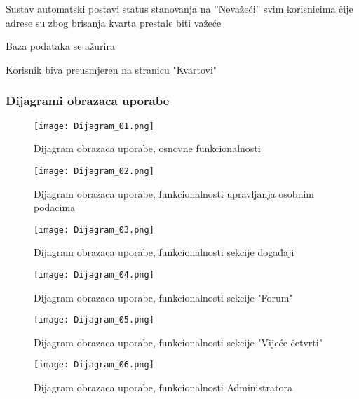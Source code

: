\begin{packed_item}
\begin{packed_item}
\begin{packed_enum}
								\item Sustav automatski postavi status stanovanja na ”Nevažeći” svim korisnicima čije adrese su zbog brisanja kvarta prestale biti važeće
								\item Baza podataka se ažurira
								\item Korisnik biva preusmjeren na stranicu "Kvartovi"
							\end{packed_enum}
					\end{packed_item}
				\end{packed_item}
				\newpage
						
				\subsubsection{Dijagrami obrazaca uporabe}
					
				
				\begin{packed_item}					
					\item[] 
					\begin{figure}[H]
					\centering
					\texttt{[image: Dijagram\_01.png]}
					\caption{Dijagram obrazaca uporabe, osnovne funkcionalnosti}
					\end{figure}
					
					\item[] \begin{figure}[H]
					\centering
					\texttt{[image: Dijagram\_02.png]}
					\caption{Dijagram obrazaca uporabe, funkcionalnosti upravljanja osobnim podacima}
					\end{figure}
					
					\begin{figure}[H]
					\centering
					\texttt{[image: Dijagram\_03.png]}
					\caption{Dijagram obrazaca uporabe, funkcionalnosti sekcije događaji}
					\end{figure}
					
					\begin{figure}[H]
					\centering
					\texttt{[image: Dijagram\_04.png]}
					\caption{Dijagram obrazaca uporabe, funkcionalnosti sekcije "Forum"}
					\end{figure}
					
					\begin{figure}[H]
					\centering
					\texttt{[image: Dijagram\_05.png]}
					\caption{Dijagram obrazaca uporabe, funkcionalnosti sekcije "Vijeće četvrti"}
					\end{figure}
					
					\begin{figure}[H]
					\centering
					\texttt{[image: Dijagram\_06.png]}
					\caption{Dijagram obrazaca uporabe, funkcionalnosti Administratora}
					\end{figure}
				\end{packed_item}
				\eject	
				
